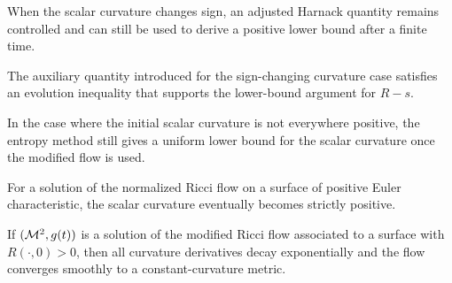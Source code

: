 \begin{proposition}
\label{ch05-prop-modified-harnack-control}
When the scalar curvature changes sign, an adjusted Harnack quantity remains controlled and can still be used to derive a positive lower bound after a finite time.
\end{proposition}

\begin{lemma}
\label{ch05-lem-aux-lower-bound}
The auxiliary quantity introduced for the sign-changing curvature case satisfies an evolution inequality that supports the lower-bound argument for \(R-s\).
\end{lemma}

\begin{proposition}
\label{ch05-prop-entropy-lower-bound-sign-changing}
In the case where the initial scalar curvature is not everywhere positive, the entropy method still gives a uniform lower bound for the scalar curvature once the modified flow is used.
\end{proposition}

\begin{proposition}
\label{ch05-prop-eventual-positivity}
For a solution of the normalized Ricci flow on a surface of positive Euler characteristic, the scalar curvature eventually becomes strictly positive.
\end{proposition}

\begin{corollary}
\label{ch05-cor-exponential-convergence-positive}
If \((\mathcal{M}^2,g(t))\) is a solution of the modified Ricci flow associated to a surface with \(R(\cdot,0)>0\), then all curvature derivatives decay exponentially and the flow converges smoothly to a constant-curvature metric.
\end{corollary}

